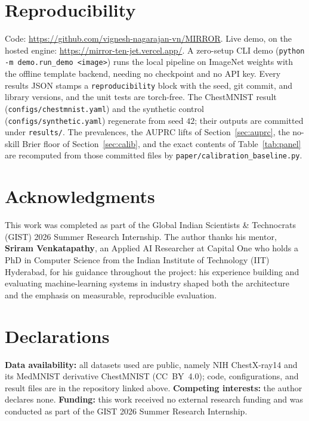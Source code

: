 \documentclass[10pt,twocolumn]{article}
\newcommand{\code}[1]{\texttt{\small #1}}
\begin{document}
\section*{Reproducibility}
\footnotesize
\begin{sloppypar}\raggedright
Code: \url{https://github.com/vignesh-nagarajan-vn/MIRROR}. Live demo, on the
hosted engine: \url{https://mirror-ten-jet.vercel.app/}. A zero-setup CLI demo
(\code{python -m demo.run\_demo <image>}) runs the local pipeline on ImageNet
weights with the offline template backend, needing no checkpoint and no API key.
Every results JSON stamps a \code{reproducibility} block with the seed, git
commit, and library versions, and the unit tests are torch-free. The ChestMNIST
result (\code{configs/chestmnist.yaml}) and the synthetic control
(\code{configs/synthetic.yaml}) regenerate from seed $42$; their outputs are
committed under \code{results/}. The prevalences, the AUPRC lifts of
Section~\ref{sec:auprc}, the no-skill Brier floor of Section~\ref{sec:calib}, and
the exact contents of Table~\ref{tab:panel} are recomputed from those committed
files by \code{paper/calibration\_baseline.py}.
\end{sloppypar}

\section*{Acknowledgments}
\small
This work was completed as part of the Global Indian Scientists \& Technocrats
(GIST) 2026 Summer Research Internship. The author thanks his mentor,
\textbf{Sriram Venkatapathy}, an Applied AI Researcher at Capital One who holds a
PhD in Computer Science from the Indian Institute of Technology (IIT) Hyderabad,
for his guidance throughout the project: his experience building and evaluating
machine-learning systems in industry shaped both the architecture and the
emphasis on measurable, reproducible evaluation.

\section*{Declarations}
\footnotesize
\textbf{Data availability:} all datasets used are public, namely NIH ChestX-ray14
and its MedMNIST derivative ChestMNIST (CC~BY~4.0); code, configurations, and result
files are in the repository linked above. \textbf{Competing interests:} the author
declares none. \textbf{Funding:} this work received no external research funding and
was conducted as part of the GIST 2026 Summer Research Internship.
\end{document}
